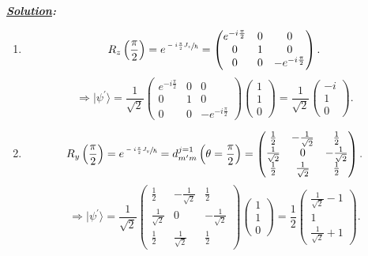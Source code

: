 \documentclass[notitlepage]{report}
\begin{document}
\textbf{\emph{\underline{Solution}:}}\\
\begin{enumerate}[label=\alph*)]
	\item
		\[
			R_z\left(\frac{\pi}{2}\right)=e^{\sfrac{-i \frac{\pi}{2}J_z}{\hslash}} =
			\begin{pmatrix}
				e^{-i \frac{\pi}{2}} & 0 & 0\\
				0 & 1 & 0\\
				0 & 0 & -e^{-i \frac{\pi}{2}}
			\end{pmatrix}
		.\] 
		\[
			\Rightarrow |\psi^\prime\rangle=\frac{1}{\sqrt{2} } 
			\begin{pmatrix}
				e^{-i \frac{\pi}{2}} & 0 & 0\\
				0 & 1 & 0\\
				0 & 0 & -e^{-i \frac{\pi}{2}}
			\end{pmatrix}
	\begin{pmatrix}
		1\\
		1\\
		0
	\end{pmatrix}=\boxed{\frac{1}{\sqrt{2} }
	\begin{pmatrix}
		-i\\
		1\\
		0
	\end{pmatrix}
}		.\] 
\item 
		\[
			R_y\left(\frac{\pi}{2}\right)=e^{\sfrac{-i \frac{\pi}{2}J_y}{\hslash}} =d_{m^\prime m}^{j=1}\left(\theta=\frac{\pi}{2}\right)=
			\begin{pmatrix}
				\frac{1}{2}& -\frac{1}{\sqrt{2}} &\frac{1}{2} \\
				\frac{1}{\sqrt{2}} & 0 & -\frac{1}{\sqrt{2}}\\
				\frac{1}{2} & \frac{1}{\sqrt{2}} &\frac{1}{2} 
			\end{pmatrix}
		.\] 
		\[
			\Rightarrow |\psi^\prime\rangle=\frac{1}{\sqrt{2} } 
			\begin{pmatrix}
				\frac{1}{2}& -\frac{1}{\sqrt{2}} &\frac{1}{2} \\
				\frac{1}{\sqrt{2}} & 0 & -\frac{1}{\sqrt{2}}\\
				\frac{1}{2} & \frac{1}{\sqrt{2}} &\frac{1}{2} 
			\end{pmatrix}
	\begin{pmatrix}
		1\\
		1\\
		0
	\end{pmatrix}=\boxed{\frac{1}{{2}}
	\begin{pmatrix}
		\frac{1}{\sqrt{2} }-1\\
		1\\
		\frac{1}{\sqrt{2} }+1
	\end{pmatrix}
}		.\] 
\end{enumerate}
\end{document}
